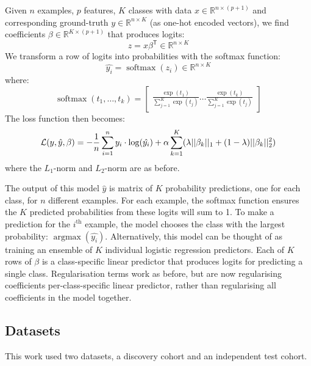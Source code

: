 \documentclass{article} %
\DeclareMathOperator*{\argmax}{argmax}
\DeclareMathOperator*{\softmax}{softmax}
\newcommand{\equationname}[1]{%
    \begingroup
        \leavevmode
        \addcontentsline{equ}{equations}{\protect\numberline{\theequation}#1}%
    \endgroup   
}
\begin{document}
Given \(n\) examples, \(p\) features, \(K\) classes with data \(x \in \mathbb{R}^{n \times (p + 1)}\) and corresponding ground-truth \(y \in \mathbb{R}^{n \times K}\) (as one-hot encoded vectors), we find coefficients \(\beta \in \mathbb{R}^{K \times (p + 1)}\) that produces logits:
\[z = x \beta^\mathsf{T} \in \mathbb{R}^{n \times K}\]
We transform a row of logits into probabilities with the softmax function:
\[\hat{y_i} = \softmax(z_i) \in \mathbb{R}^{n \times K}\]
where:
\[\softmax(t_1,\hdots , t_k) =
    \begin{bmatrix}
        \frac{\exp(t_1)}{\sum_{j=1}^{K} \exp(t_j)}
        \hdots
        \frac{\exp(t_k)}{\sum_{j=1}^{K} \exp(t_j)}
    \end{bmatrix}
\]
The loss function then becomes:
\begin{equation} \equationname{Elastic Net logistic regression} \label{eqn:mc_log_elastic_net}
    \mathcal{L}(y, \hat{y}, \beta) = -\frac{1}{n}\sum_{i=1}^{n} y_i \cdot \log(\hat{y_i}) + \alpha\sum_{k=1}^{K}(\lambda||\beta_k||_1 + (1 - \lambda)||\beta_k||_2^2)
\end{equation}
where the \(L_1\)-norm and \(L_2\)-norm are as before.

The output of this model \(\hat{y}\) is matrix of \(K\) probability predictions, one for each class, for \(n\) different examples. For each example, the softmax function ensures the \(K\) predicted probabilities from these logits will sum to 1. To make a prediction for the \(i^\text{th}\) example, the model chooses the class with the largest probability: \(\argmax(\hat{y_i})\). Alternatively, this model can be thought of as training an ensemble of \(K\) individual logistic regression predictors. Each of \(K\) rows of \(\beta\) is a class-specific linear predictor that produces logits for predicting a single class. Regularisation terms work as before, but are now regularising coefficients per-class-specific linear predictor, rather than regularising all coefficients in the model together.

\subsection{Datasets}
This work used two datasets, a discovery cohort and an independent test cohort.
\end{document}
